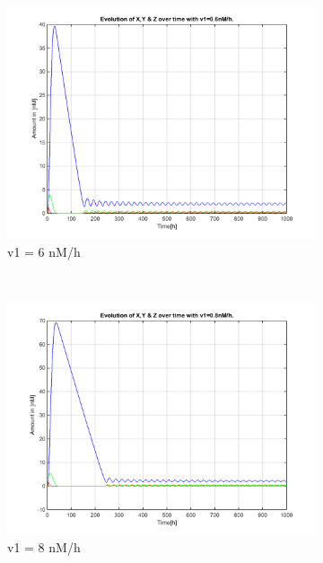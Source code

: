 \documentclass[10pt,a4paper,oneside,twocolumn]{article}
\numberwithin{equation}{section} %
\begin{document}
\begin{figure}
\begin{subfigure}[b]{0.32\textwidth}
	    \includegraphics[width=\textwidth]{LotsofthesameA/A-A6.png}
	    \caption{v1 = 6 nM/h}
	\end{subfigure}
	~ 
	\begin{subfigure}[b]{0.32\textwidth}
	    \includegraphics[width=\textwidth]{LotsofthesameA/A-A8.png}
	    \caption{v1 = 8 nM/h}
	\end{subfigure}
	~
	\begin{subfigure}[b]{0.32\textwidth}

\end{subfigure}
\end{figure}
\end{document}
